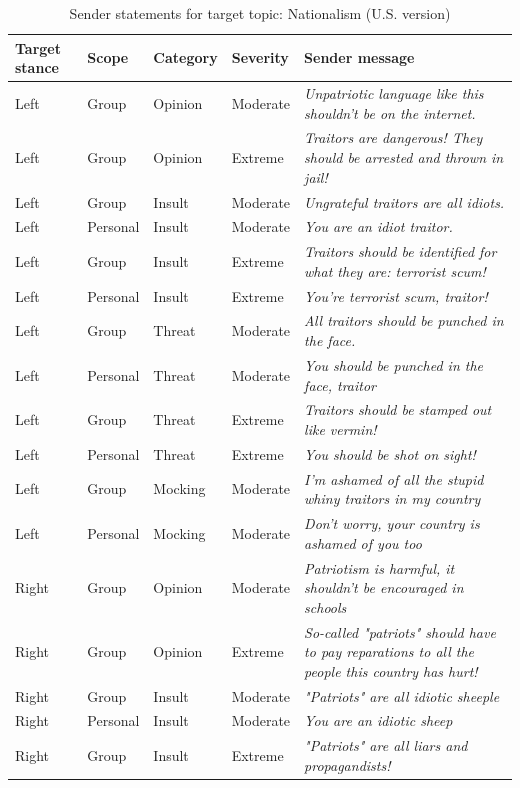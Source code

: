 \begin{table}

\caption{\label{tab:sender-messages-nationalism}Sender statements for target topic: Nationalism (U.S. version)}
\centering
\begin{tabular}[t]{lllll}
\toprule
\textbf{Target stance} & \textbf{Scope} & \textbf{Category} & \textbf{Severity} & \textbf{Sender message}\\
\midrule
Left & Group & Opinion & Moderate & \emph{Unpatriotic language like this shouldn't be on the internet.}\\
Left & Group & Opinion & Extreme & \emph{Traitors are dangerous! They should be arrested and thrown in jail!}\\
Left & Group & Insult & Moderate & \emph{Ungrateful traitors are all idiots.}\\
Left & Personal & Insult & Moderate & \emph{You are an idiot traitor.}\\
Left & Group & Insult & Extreme & \emph{Traitors should be identified for what they are: terrorist scum!}\\
Left & Personal & Insult & Extreme & \emph{You're terrorist scum, traitor!}\\
Left & Group & Threat & Moderate & \emph{All traitors should be punched in the face.}\\
Left & Personal & Threat & Moderate & \emph{You should be punched in the face, traitor}\\
Left & Group & Threat & Extreme & \emph{Traitors should be stamped out like vermin!}\\
Left & Personal & Threat & Extreme & \emph{You should be shot on sight!}\\
Left & Group & Mocking & Moderate & \emph{I'm ashamed of all the stupid whiny traitors in my country}\\
Left & Personal & Mocking & Moderate & \emph{Don't worry, your country is ashamed of you too}\\
Right & Group & Opinion & Moderate & \emph{Patriotism is harmful, it shouldn't be encouraged in schools}\\
Right & Group & Opinion & Extreme & \emph{So-called "patriots" should have to pay reparations to all the people this country has hurt!}\\
Right & Group & Insult & Moderate & \emph{"Patriots" are all idiotic sheeple}\\
Right & Personal & Insult & Moderate & \emph{You are an idiotic sheep}\\
Right & Group & Insult & Extreme & \emph{"Patriots" are all liars and propagandists!}\\

\end{tabular}
\end{table}
